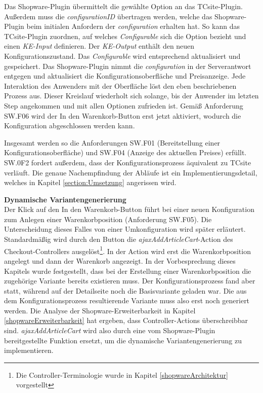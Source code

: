 \documentclass[11pt, a4paper, titlepage, listof=totoc, bibliography=totoc, index=totoc, twoside, openright, headings=normal, draft]{scrreprt}
\begin{document}
Das Shopware-Plugin übermittelt die gewählte Option an das TCsite-Plugin. Außerdem muss die \emph{configurationID} übertragen werden, welche das Shopware-Plugin beim initialen Anfordern der \emph{configuration} erhalten hat. So kann das TCsite-Plugin zuordnen, auf welches \emph{Configurable} sich die Option bezieht und einen \emph{KE-Input} definieren. Der \emph{KE-Output} enthält den neuen Konfigurationszustand. Das \emph{Configurable} wird entsprechend aktualisiert und gespeichert. Das Shopware-Plugin nimmt die \emph{configuration} in der Serverantwort entgegen und aktualisiert die Konfigurationsoberfläche und Preisanzeige. Jede Interaktion des Anwenders mit der Oberfläche löst den eben beschriebenen Prozess aus. Dieser Kreislauf wiederholt sich solange, bis der Anwender im letzten Step angekommen und mit allen Optionen zufrieden ist. Gemäß Anforderung SW.F06 wird der \glqq In den Warenkorb\grqq{}-Button erst jetzt aktiviert, wodurch die Konfiguration abgeschlossen werden kann.

Insgesamt werden so die Anforderungen SW.F01 (Bereitstellung einer Konfigurationsoberfläche) und SW.F04 (Anzeige des aktuellen Preises) erfüllt. SW.0F2 fordert außerdem, dass der Konfigurationsprozess äquivalent zu TCsite verläuft. Die genaue Nachempfindung der Abläufe ist ein Implementierungsdetail, welches in Kapitel \ref{section:Umsetzung} angerissen wird.

\textbf{Dynamische Variantengenerierung}\\
Der Klick auf den \glqq In den Warenkorb\grqq{}-Button führt bei einer neuen Konfiguration zum Anlegen einer Warenkorbposition (Anforderung SW.F05). Die Unterscheidung dieses Falles von einer Umkonfiguration wird später erläutert.  Standardmäßig wird durch den Button die \emph{ajaxAddArticleCart}-Action des Checkout-Controllers ausgelöst\footnote{Die Controller-Terminologie wurde in Kapitel \ref{shopwareArchitektur} vorgestellt}. In der Action wird erst die Warenkorbposition angelegt und dann der Warenkorb angezeigt. In der Vorbesprechung dieses Kapitels wurde festgestellt, dass bei der Erstellung einer Warenkorbposition die zugehörige Variante bereits existieren muss. Der Konfigurationsprozess fand aber statt, während auf der Detailseite noch die Basisvariante geladen war. Die aus dem Konfigurationsprozess resultierende Variante muss also erst noch generiert werden. Die Analyse der Shopware-Erweiterbarkeit in Kapitel \ref{shopwareErweiterbarkeit} hat ergeben, dass Controller-Actions überschreibbar sind. \emph{ajaxAddArticleCart} wird also durch eine vom Shopware-Plugin bereitgestellte Funktion ersetzt, um die dynamische Variantengenerierung zu implementieren.
\end{document}
